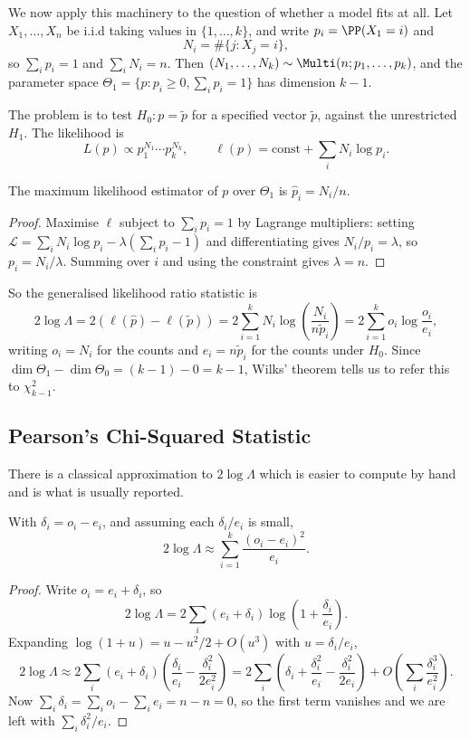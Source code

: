 We now apply this machinery to the question of whether a model fits at all. Let $X_1, \dots, X_n$ be i.i.d taking values in $\{1, \dots, k\}$, and write $p_i = \PP(X_1 = i)$ and
$$
N_i = \#\{j : X_j = i\},
$$
so $\sum_i p_i = 1$ and $\sum_i N_i = n$. Then $(N_1,\dots,N_k) \sim \Multi(n; p_1, \dots, p_k)$, and the parameter space $\Theta_1 = \{p : p_i \geq 0, \sum_i p_i = 1\}$ has dimension $k-1$.

The  problem is to test $H_0 : p = \tilde p$ for a specified vector $\tilde p$, against the unrestricted $H_1$. The likelihood is
$$
L(p) \propto p_1^{N_1}\cdots p_k^{N_k}, \qquad \ell(p) = \text{const} + \sum_i N_i \log p_i.
$$

\begin{lemma}
  The maximum likelihood estimator of $p$ over $\Theta_1$ is $\hat p_i = N_i/n$.
\end{lemma}
\begin{proof}
  Maximise $\ell$ subject to $\sum_i p_i = 1$ by Lagrange multipliers: setting $\mathcal{L} = \sum_i N_i\log p_i - \lambda(\sum_i p_i - 1)$ and differentiating gives $N_i/p_i = \lambda$, so $p_i = N_i/\lambda$. Summing over $i$ and using the constraint gives $\lambda = n$.
\end{proof}

So the generalised likelihood ratio statistic is
$$
2\log\Lambda = 2\left(\ell(\hat p) - \ell(\tilde p)\right) = 2\sum_{i=1}^{k}N_i\log\left(\frac{N_i}{n\tilde p_i}\right) = 2\sum_{i=1}^{k}o_i\log\frac{o_i}{e_i},
$$
writing $o_i = N_i$ for the  counts and $e_i = n\tilde p_i$ for the counts  under $H_0$. Since $\dim\Theta_1 - \dim\Theta_0 = (k-1) - 0 = k-1$, Wilks' theorem tells us to refer this to $\chi^2_{k-1}$.

\subsection{Pearson's Chi-Squared Statistic}

There is a classical approximation to $2\log\Lambda$ which is easier to compute by hand and is what is usually reported.

\begin{proposition}
  With $\delta_i = o_i - e_i$, and assuming each $\delta_i/e_i$ is small,
  $$
  2\log\Lambda \approx \sum_{i=1}^{k}\frac{(o_i-e_i)^2}{e_i}.
  $$
\end{proposition}
\begin{proof}
  Write $o_i = e_i + \delta_i$, so
  $$
  2\log\Lambda = 2\sum_i (e_i+\delta_i)\log\left(1 + \frac{\delta_i}{e_i}\right).
  $$
  Expanding $\log(1+u) = u - u^2/2 + O(u^3)$ with $u = \delta_i/e_i$,
  $$
  2\log\Lambda \approx 2\sum_i (e_i+\delta_i)\left(\frac{\delta_i}{e_i} - \frac{\delta_i^2}{2e_i^2}\right) = 2\sum_i\left(\delta_i + \frac{\delta_i^2}{e_i} - \frac{\delta_i^2}{2e_i}\right) + O\!\left(\sum_i \frac{\delta_i^3}{e_i^2}\right).
  $$
  Now $\sum_i\delta_i = \sum_i o_i - \sum_i e_i = n - n = 0$, so the first term vanishes and we are left with $\sum_i \delta_i^2/e_i$.
\end{proof}

